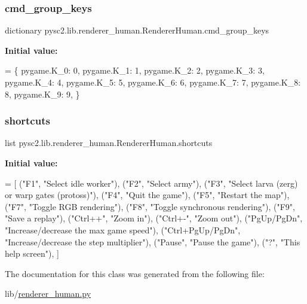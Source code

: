 \subsubsection{\texorpdfstring{cmd\+\_\+group\+\_\+keys}{cmd\_group\_keys}}
{\footnotesize\ttfamily dictionary pysc2.\+lib.\+renderer\+\_\+human.\+Renderer\+Human.\+cmd\+\_\+group\+\_\+keys\hspace{0.3cm}{\ttfamily [static]}}

{\bfseries Initial value\+:}
\begin{DoxyCode}
=  \{
      pygame.K\_0: 0,
      pygame.K\_1: 1,
      pygame.K\_2: 2,
      pygame.K\_3: 3,
      pygame.K\_4: 4,
      pygame.K\_5: 5,
      pygame.K\_6: 6,
      pygame.K\_7: 7,
      pygame.K\_8: 8,
      pygame.K\_9: 9,
  \}
\end{DoxyCode}
\mbox{\label{classpysc2_1_1lib_1_1renderer__human_1_1_renderer_human_a333c02966efae679e670e9de19640957}} 
\subsubsection{\texorpdfstring{shortcuts}{shortcuts}}
{\footnotesize\ttfamily list pysc2.\+lib.\+renderer\+\_\+human.\+Renderer\+Human.\+shortcuts\hspace{0.3cm}{\ttfamily [static]}}

{\bfseries Initial value\+:}
\begin{DoxyCode}
=  [
      (\textcolor{stringliteral}{"F1"}, \textcolor{stringliteral}{"Select idle worker"}),
      (\textcolor{stringliteral}{"F2"}, \textcolor{stringliteral}{"Select army"}),
      (\textcolor{stringliteral}{"F3"}, \textcolor{stringliteral}{"Select larva (zerg) or warp gates (protoss)"}),
      (\textcolor{stringliteral}{"F4"}, \textcolor{stringliteral}{"Quit the game"}),
      (\textcolor{stringliteral}{"F5"}, \textcolor{stringliteral}{"Restart the map"}),
      (\textcolor{stringliteral}{"F7"}, \textcolor{stringliteral}{"Toggle RGB rendering"}),
      (\textcolor{stringliteral}{"F8"}, \textcolor{stringliteral}{"Toggle synchronous rendering"}),
      (\textcolor{stringliteral}{"F9"}, \textcolor{stringliteral}{"Save a replay"}),
      (\textcolor{stringliteral}{"Ctrl++"}, \textcolor{stringliteral}{"Zoom in"}),
      (\textcolor{stringliteral}{"Ctrl+-"}, \textcolor{stringliteral}{"Zoom out"}),
      (\textcolor{stringliteral}{"PgUp/PgDn"}, \textcolor{stringliteral}{"Increase/decrease the max game speed"}),
      (\textcolor{stringliteral}{"Ctrl+PgUp/PgDn"}, \textcolor{stringliteral}{"Increase/decrease the step multiplier"}),
      (\textcolor{stringliteral}{"Pause"}, \textcolor{stringliteral}{"Pause the game"}),
      (\textcolor{stringliteral}{"?"}, \textcolor{stringliteral}{"This help screen"}),
  ]
\end{DoxyCode}


The documentation for this class was generated from the following file\+:\begin{DoxyCompactItemize}
\item 
lib/\mbox{\hyperlink{renderer__human_8py}{renderer\+\_\+human.\+py}}\end{DoxyCompactItemize}
